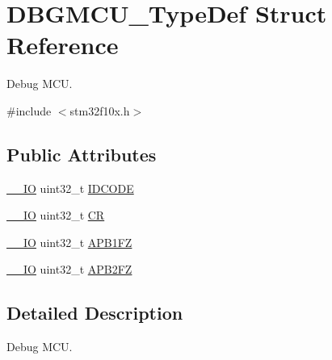 \hypertarget{struct_d_b_g_m_c_u___type_def}{\section{D\-B\-G\-M\-C\-U\-\_\-\-Type\-Def Struct Reference}
\label{struct_d_b_g_m_c_u___type_def}
}


Debug M\-C\-U.  




{\ttfamily \#include $<$stm32f10x.\-h$>$}

\subsection*{Public Attributes}
\begin{DoxyCompactItemize}
\item 
\hyperlink{group___c_m_s_i_s__core__definitions_gaec43007d9998a0a0e01faede4133d6be}{\-\_\-\-\_\-\-I\-O} uint32\-\_\-t \hyperlink{struct_d_b_g_m_c_u___type_def_a0cc3561c124d06bb57dfa855e43ed99f}{I\-D\-C\-O\-D\-E}
\item 
\hyperlink{group___c_m_s_i_s__core__definitions_gaec43007d9998a0a0e01faede4133d6be}{\-\_\-\-\_\-\-I\-O} uint32\-\_\-t \hyperlink{struct_d_b_g_m_c_u___type_def_a15981828f2b915d38570cf6684e99a53}{C\-R}
\item 
\hyperlink{group___c_m_s_i_s__core__definitions_gaec43007d9998a0a0e01faede4133d6be}{\-\_\-\-\_\-\-I\-O} uint32\-\_\-t \hyperlink{struct_d_b_g_m_c_u___type_def_aac341c7e09cd5224327eeb7d9f122bed}{A\-P\-B1\-F\-Z}
\item 
\hyperlink{group___c_m_s_i_s__core__definitions_gaec43007d9998a0a0e01faede4133d6be}{\-\_\-\-\_\-\-I\-O} uint32\-\_\-t \hyperlink{struct_d_b_g_m_c_u___type_def_a011f892d86367dbe786964b14bc515a6}{A\-P\-B2\-F\-Z}
\end{DoxyCompactItemize}


\subsection{Detailed Description}
Debug M\-C\-U. 

